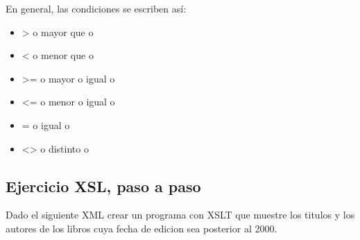 \documentclass[letterpaper,10pt,spanish]{sphinxmanual}
\begin{document}
\begin{sphinxVerbatim}[commandchars=\\\{\}]
                                 
\end{sphinxVerbatim}

En general, las condiciones se escriben así:
\begin{itemize}
\item {} 
\textgreater{} o mayor que o 

\item {} 
\textless{} o menor que o 

\item {} 
\textgreater{}= o mayor o igual o 

\item {} 
\textless{}= o menor o igual o 

\item {} 
= o igual o 

\item {} 
\textless{}\textgreater{} o distinto o 

\end{itemize}


\subsection{Ejercicio XSL, paso a paso}
\label{\detokenize{tema7:ejercicio-xsl-paso-a-paso}}
Dado el siguiente XML crear un programa con XSLT que muestre los titulos y los autores de los libros cuya fecha de edicion sea posterior al 2000.
\end{document}

